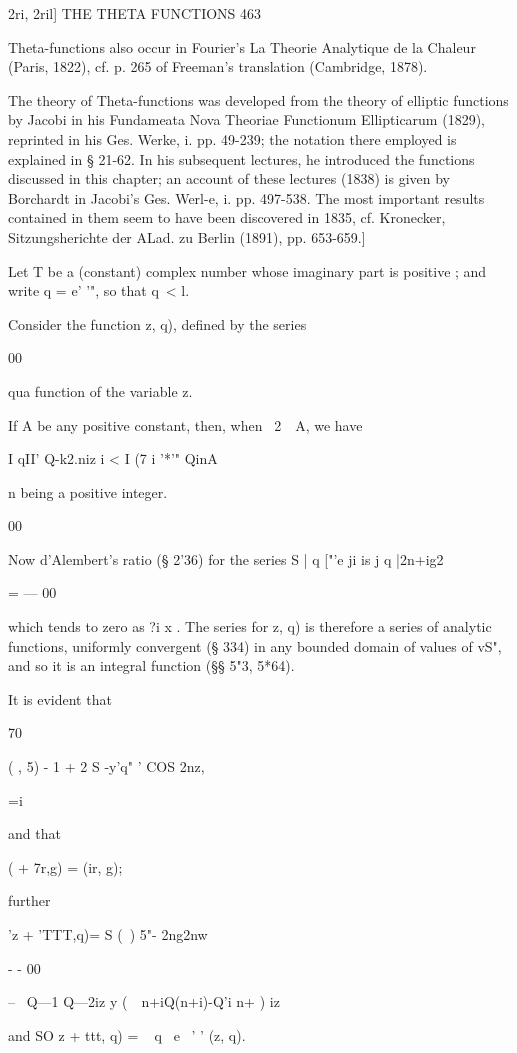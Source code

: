 2ri, 2ril] THE THETA FUNCTIONS 463

Theta-functions also occur in Fourier's La Theorie Analytique de la
Chaleur (Paris, 1822), cf. p. 265 of Freeman's translation (Cambridge,
1878).

The theory of Theta-functions was developed from the theory of
elliptic functions by Jacobi in his Fundameata Nova Theoriae
Functionum Ellipticarum (1829), reprinted in his Ges. Werke, i. pp.
49-239; the notation there employed is explained in § 21-62. In his
subsequent lectures, he introduced the functions discussed in this
chapter; an account of these lectures (1838) is given by Borchardt in
Jacobi's Ges. Werl-e, i. pp. 497-538. The most important results
contained in them seem to have been discovered in 1835, cf. Kronecker,
Sitzungsherichte der ALad. zu Berlin (1891), pp. 653-659.]

Let T be a (constant) complex number whose imaginary part is positive
; and write q = e' '", so that q\ < l.

Consider the function z, q), defined by the series

00

qua function of the variable z.

If A be any positive constant, then, when \ 2\ \ A, we have

I qII' Q-k2.niz i < I (7 i '*'" QinA

n being a positive integer.

00

Now d'Alembert's ratio (§ 2'36) for the series S | q ["'e ji is j q
|2n+ig2

  = — 00

which tends to zero as ?i x . The series for z, q) is therefore a
series of analytic functions, uniformly convergent (§ 334) in any
bounded domain of values of vS", and so it is an integral function (§§
5"3, 5*64).

It is evident that

 70

  ( , 5) - 1 + 2 S -y'q" ' COS 2nz,

 =i

and that

 ( + 7r,g) = (ir, g);

further

'z + 'TTT,q)= S (\ ) 5"- 2ng2nw

 - - 00

-- \ Q—1 Q—2iz y (\ \ n+iQ(n+i)-Q'i n+ ) iz

and SO z + ttt, q) = ~ q~ e~ ' ' (z, q).

